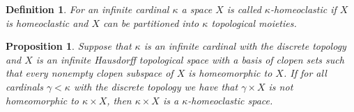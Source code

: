 \documentclass[10pt,a4paper]{amsart}
\newtheorem{definition}{Definition}
\newtheorem{proposition}{Proposition}
\begin{document}
\begin{definition}\label{def:kappaclast}
  For an infinite cardinal $\kappa$ a space $X$ is called {\em $\kappa$-homeoclastic} if $X$ is homeoclastic and $X$  can be partitioned into \(\kappa\) topological moieties.
\end{definition}

\begin{proposition}\label{kappa}
    Suppose that \(\kappa\) is an infinite cardinal with the discrete topology and \(X\) is an infinite Hausdorff topological space with a basis of clopen sets such that every nonempty clopen subspace of \(X\) is homeomorphic to \(X\).
    If for all cardinals \(\gamma <\kappa\) with the discrete topology we have that \(\gamma \times X \) is not homeomorphic to \(\kappa \times X\), then \(\kappa \times X\) is a \(\kappa\)-homeoclastic space.
\end{proposition}
\end{document}
